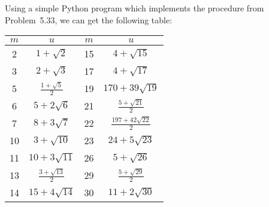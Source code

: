 \documentclass[11pt,letterpaper]{article}
\begin{document}
\begin{solution}
    Using a simple Python program which implements the procedure from Problem~5.33, we can get the following table:
    \begin{center}
        \renewcommand*{\arraystretch}{1.5}
        \begin{tabular}{|c|c||c|c|}
            \hline
            $m$ & $u$ & $m$ & $u$\\
            \hline
            2 &  $1+\sqrt{2}$ & 15 & $4+\sqrt{15}$\\ 
            \hline
            3 &  $2+\sqrt{3}$ & 17 & $4+\sqrt{17}$\\
            \hline
            5 &  $\frac{1+\sqrt{5}}{2}$ & 19 & $170+39\sqrt{19}$\\
            \hline
            6 &  $5+2\sqrt{6}$ & 21 & $\frac{5+\sqrt{21}}{2}$\\
            \hline
            7 &  $8+3\sqrt{7}$ & 22 & $\frac{197+42\sqrt{22}}{2}$\\
            \hline
            10 & $3+\sqrt{10}$ & 23 & $24+5\sqrt{23}$\\
            \hline
            11 & $10+3\sqrt{11}$ & 26 & $5+\sqrt{26}$\\
            \hline
            13 & $\frac{3+\sqrt{13}}{2}$ & 29 & $\frac{5+\sqrt{29}}{2}$\\
            \hline
            14 & $15+4\sqrt{14}$ & 30 & $11+2\sqrt{30}$\\
            \hline
        \end{tabular}
    \end{center}

\end{solution}
\end{document}
